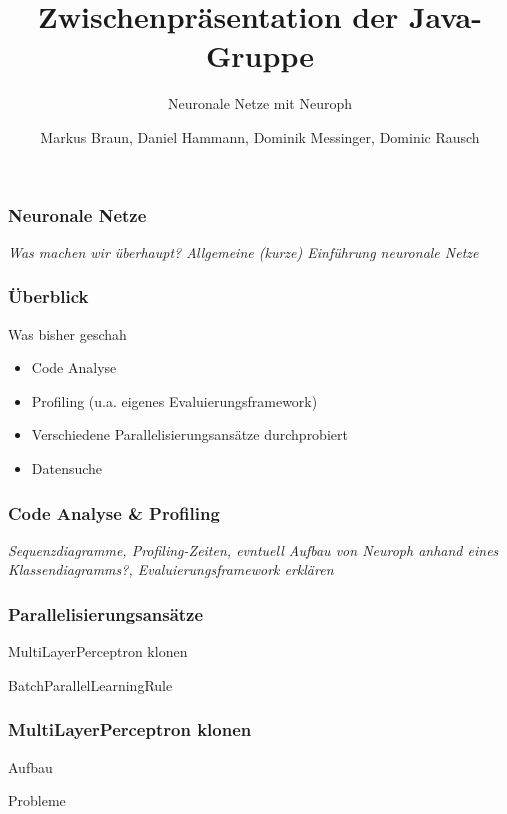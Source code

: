 \documentclass[18pt]{beamer}
\title{Zwischenpräsentation der Java-Gruppe}
\subtitle{Neuronale Netze mit Neuroph}
\author{Markus Braun, Daniel Hammann, Dominik Messinger, Dominic Rausch}
\institute{Institut für Programmstrukturen und Datenorganisation (IPD), Lehrstuhl für Programmiersysteme}
\begin{document}
	\maketitle

	\begin{frame}[c]\frametitle{Neuronale Netze}
		\begin{center}
		\textit{Was machen wir überhaupt? Allgemeine (kurze) Einführung neuronale Netze}
		\end{center}
	\end{frame}

	\begin{frame}[c]\frametitle{Überblick}
		\begin{block}{Was bisher geschah}
		    \begin{itemize}
		    	\item Code Analyse
		    	\item Profiling (u.a. eigenes Evaluierungsframework)
		    	\item Verschiedene Parallelisierungsansätze durchprobiert
		    	\item Datensuche
		    \end{itemize}		    
		\end{block}
	\end{frame}
	
	\begin{frame}[c]\frametitle{Code Analyse \& Profiling}
		\begin{block}{}
			\begin{center}
			\textit{Sequenzdiagramme, Profiling-Zeiten, evntuell Aufbau von Neuroph anhand eines Klassendiagramms?, Evaluierungsframework erklären}
			\end{center}
		\end{block}
	\end {frame}
	
	\begin{frame}[c]\frametitle{Parallelisierungsansätze}
		\begin{block}{}
			MultiLayerPerceptron klonen
		\end{block}
		\begin{block}{}
			BatchParallelLearningRule
		\end{block}
	\end {frame}
	
	\begin{frame}[c]\frametitle{MultiLayerPerceptron klonen}
		\begin{block}{Aufbau}
			
		\end{block}
		\begin{block}{Probleme}
		
		\end{block}
	\end {frame}
	
\end{document}
